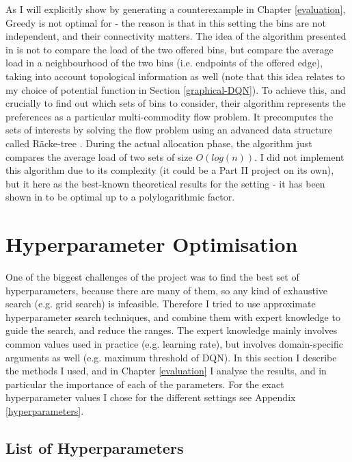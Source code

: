 As I will explicitly show by generating a counterexample in Chapter \ref{evaluation}, Greedy is not optimal for \GraphicalTwoChoice - the reason is that in this setting the bins are not independent, and their connectivity matters. The idea of the algorithm presented in \cite{bansal2021twochoicegraphical} is not to compare the load of the two offered bins, but compare the average load in a neighbourhood of the two bins (i.e. endpoints of the offered edge), taking into account topological information as well (note that this idea relates to my choice of potential function in Section \ref{graphical-DQN}). To achieve this, and crucially to find out which sets of bins to consider, their algorithm represents the preferences as a particular multi-commodity flow problem. It precomputes the sets of interests by solving the flow problem using an advanced data structure called R\"{a}cke-tree \cite{racke2008racketree}. During the actual allocation phase, the algorithm just compares the average load of two sets of size $O(log(n))$. I did not implement this algorithm due to its complexity (it could be a Part II project on its own), but it here as the best-known theoretical results for the \GraphicalTwoChoice setting - it has been shown in \cite{bansal2021twochoicegraphical} to be optimal up to a polylogarithmic factor.



\section{Hyperparameter Optimisation}

One of the biggest challenges of the project was to find the best set of hyperparameters, because there are many of them, so any kind of exhaustive search (e.g. grid search) is infeasible. Therefore I tried to use approximate hyperparameter search techniques, and combine them with expert knowledge to guide the search, and reduce the ranges. The expert knowledge mainly involves common values used in practice (e.g. learning rate), but involves domain-specific arguments as well (e.g. maximum threshold of DQN). In this section I describe the methods I used, and in Chapter \ref{evaluation} I analyse the results, and in particular the importance of each of the parameters. For the exact hyperparameter values I chose for the different settings see Appendix \ref{hyperparameters}.


\subsection{List of Hyperparameters}


